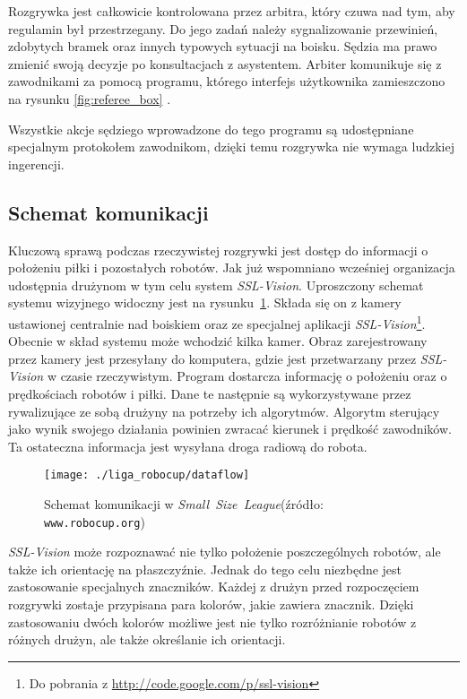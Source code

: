 	Rozgrywka jest całkowicie kontrolowana przez arbitra, który czuwa nad tym, aby  regulamin był przestrzegany. Do
	jego zadań należy sygnalizowanie przewinień, zdobytych bramek oraz innych typowych sytuacji na boisku.
	Sędzia ma prawo zmienić swoją decyzje po konsultacjach z asystentem. Arbiter komunikuje się z zawodnikami za pomocą programu, którego interfejs użytkownika zamieszczono na rysunku \ref{fig:referee_box} .

	Wszystkie akcje sędziego wprowadzone do tego programu są udostępniane specjalnym protokołem zawodnikom, dzięki temu rozgrywka nie wymaga ludzkiej ingerencji.
	\subsection{Schemat komunikacji}
	Kluczową sprawą podczas rzeczywistej rozgrywki jest dostęp do informacji o położeniu piłki
	i pozostałych robotów. Jak już wspomniano wcześniej organizacja udostępnia drużynom w tym celu system \textit{SSL-Vision}. Uproszczony schemat systemu
	wizyjnego widoczny jest na rysunku~\ref{fig:comunication}.
	Składa się on z kamery ustawionej centralnie nad boiskiem oraz ze specjalnej aplikacji \mbox{\emph{SSL-Vision}}\footnote{ Do pobrania z \url{http://code.google.com/p/ssl-vision}}.
	Obecnie w skład systemu może wchodzić kilka kamer.
	Obraz zarejestrowany przez kamery jest przesyłany do komputera, gdzie jest przetwarzany przez \emph{SSL-Vision} w czasie rzeczywistym. Program dostarcza informację 
	o położeniu oraz o prędkościach robotów i piłki. Dane te następnie są wykorzystywane przez rywalizujące ze sobą drużyny na potrzeby ich algorytmów.
 	Algorytm sterujący jako wynik swojego działania powinien zwracać kierunek i prędkość zawodników. Ta ostateczna informacja jest wysyłana droga radiową do robota.
	\begin{figure}[H]
	\centering
	\texttt{[image: ./liga\_robocup/dataflow]}
	\caption{Schemat komunikacji w  \mbox{\emph{Small Size League}}\newline(źródło: \texttt{www.robocup.org}) }
	\label{fig:comunication}
	\end{figure} 	
	\mbox{\emph{SSL-Vision}} może rozpoznawać nie tylko położenie poszczególnych robotów, ale także ich orientację na
	płaszczyźnie. Jednak do tego celu niezbędne jest zastosowanie specjalnych znaczników. Każdej z drużyn przed rozpoczęciem rozgrywki zostaje przypisana para kolorów, 
	jakie zawiera znacznik. Dzięki zastosowaniu dwóch kolorów możliwe jest nie tylko rozróżnianie robotów z różnych drużyn, ale także określanie ich orientacji.

